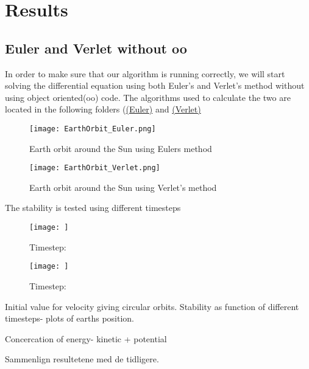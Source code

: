 \documentclass[../main.tex]{subfiles}
\begin{document}
\section{Results}\label{results}
\subsection{Euler and Verlet without oo}
In order to make sure that our algorithm is running correctly, we will start solving the differential equation using both Euler's and Verlet's method without using object oriented(oo) code. The algorithms used to calculate the two are located in the following folders (\href{https://github.com/kmaasrud/Project-5/tree/master/code/Earth-Sun_Euler-FWD}{(Euler)} and \href{https://github.com/kmaasrud/Project-5/tree/master/code/Earth-Sun_Verlet}{(Verlet)}

\begin{figure}[!h]
  \centering
  \parbox{5cm}{
  \texttt{[image: EarthOrbit\_Euler.png]}
  \caption{Earth orbit around the Sun using Eulers method}
  \label{fig:EarthOrbit_Euler}}
  \qquad
  \begin{minipage}{5cm}
    \texttt{[image: EarthOrbit\_Verlet.png]}
    \caption{Earth orbit around the Sun using Verlet's method}
    \label{fig:EarthOrbit_Verlet}
  \end{minipage}
  \end{figure}
\FloatBarrier


The stability is tested using different timesteps
\begin{figure}[!h]
  \centering
  \parbox{5cm}{
  \texttt{[image: ]}
  \caption{Timestep: }
  \label{fig:}}
  \qquad
  \begin{minipage}{5cm}
    \texttt{[image: ]}
    \caption{Timestep: }
    \label{fig:}
  \end{minipage}
  \end{figure}
\FloatBarrier

Initial value for velocity giving circular orbits.
Stability as function of different timesteps- plots of earths position.

Concercation of energy- kinetic + potential

Sammenlign resultetene med de tidligere.
\end{document}
